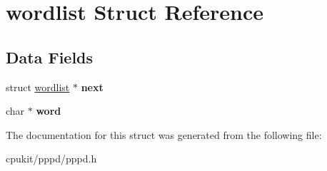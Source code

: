 \hypertarget{structwordlist}{}\section{wordlist Struct Reference}
\label{structwordlist}
\subsection*{Data Fields}
\begin{DoxyCompactItemize}
\item 
\mbox{\label{structwordlist_a6a9fb0cf06d47f1bf57f0c71889cb889}} 
struct \mbox{\hyperlink{structwordlist}{wordlist}} $\ast$ {\bfseries next}
\item 
\mbox{\label{structwordlist_adf182e526a01f9bcf7e01e869a7de1a3}} 
char $\ast$ {\bfseries word}
\end{DoxyCompactItemize}


The documentation for this struct was generated from the following file\+:\begin{DoxyCompactItemize}
\item 
cpukit/pppd/pppd.\+h\end{DoxyCompactItemize}
